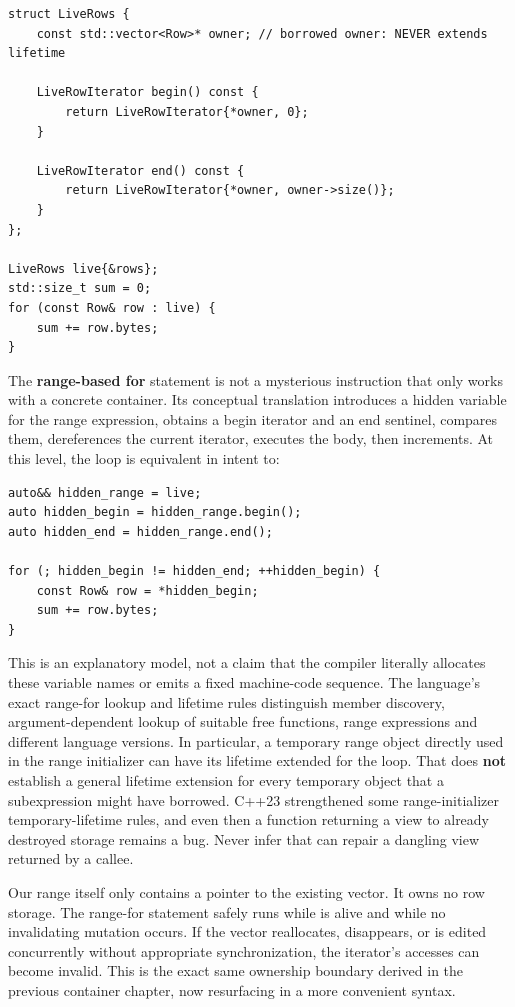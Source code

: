 \begin{verbatim}
struct LiveRows {
    const std::vector<Row>* owner; // borrowed owner: NEVER extends lifetime

    LiveRowIterator begin() const {
        return LiveRowIterator{*owner, 0};
    }

    LiveRowIterator end() const {
        return LiveRowIterator{*owner, owner->size()};
    }
};

LiveRows live{&rows};
std::size_t sum = 0;
for (const Row& row : live) {
    sum += row.bytes;
}
\end{verbatim}

The \textbf{range-based for} statement is not a mysterious instruction that only works with a concrete container. Its conceptual translation introduces a hidden variable for the range expression, obtains a begin iterator and an end sentinel, compares them, dereferences the current iterator, executes the body, then increments. At this level, the loop is equivalent in intent to:

\begin{verbatim}
auto&& hidden_range = live;
auto hidden_begin = hidden_range.begin();
auto hidden_end = hidden_range.end();

for (; hidden_begin != hidden_end; ++hidden_begin) {
    const Row& row = *hidden_begin;
    sum += row.bytes;
}
\end{verbatim}

This is an explanatory model, not a claim that the compiler literally allocates these variable names or emits a fixed machine-code sequence. The language's exact range-for lookup and lifetime rules distinguish member  discovery, argument-dependent lookup of suitable free functions, range expressions and different language versions. In particular, a temporary range object directly used in the range initializer can have its lifetime extended for the loop. That does \textbf{not} establish a general lifetime extension for every temporary object that a subexpression might have borrowed. C++23 strengthened some range-initializer temporary-lifetime rules, and even then a function returning a view to already destroyed storage remains a bug. Never infer that  can repair a dangling view returned by a callee.

Our  range itself only contains a pointer to the existing vector. It owns no row storage. The range-for statement safely runs while  is alive and while no invalidating mutation occurs. If the vector reallocates, disappears, or is edited concurrently without appropriate synchronization, the iterator's accesses can become invalid. This is the exact same ownership boundary derived in the previous container chapter, now resurfacing in a more convenient syntax.

